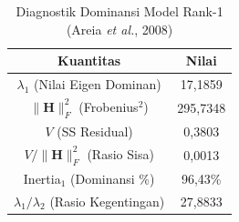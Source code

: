 \begin{table}[H]
\centering
\small
\caption{Diagnostik Dominansi Model Rank-1 (Areia \textit{et al.}, 2008)} \label{tab:sample1struktur_diagnostik}
\begin{tabular}{|c|c|}
\hline
\textbf{Kuantitas} & \textbf{Nilai} \\
\hline
$\lambda_1$ (Nilai Eigen Dominan) & 17,1859 \\
$\|\mathbf{H}\|_F^2$ (Frobenius$^2$) & 295,7348 \\
$V$ (SS Residual) & 0,3803 \\
$V / \|\mathbf{H}\|_F^2$ (Rasio Sisa) & 0,0013 \\
Inertia$_1$ (Dominansi \%) & 96,43\% \\
$\lambda_1 / \lambda_2$ (Rasio Kegentingan) & 27,8833 \\
\hline
\end{tabular}
\end{table}